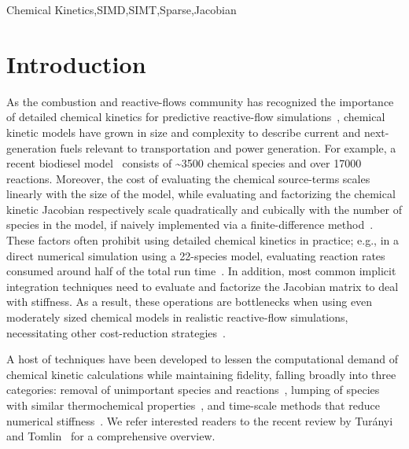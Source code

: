 \documentclass[12pt,number,sort&compress,preprint]{elsarticle}
\begin{document}
\begin{frontmatter}
\begin{keyword}
    Chemical Kinetics\sep SIMD\sep SIMT\sep Sparse\sep Jacobian
\end{keyword}

\end{frontmatter}

\section{Introduction}
%

As the combustion and reactive-flows community has recognized the importance of detailed chemical kinetics for predictive reactive-flow simulations~\cite{LU2009192}, chemical kinetic models have grown in size and complexity to describe current and next-generation fuels relevant to transportation and power generation.
For example, a recent biodiesel model~\cite{WESTBROOK2011742} consists of \textasciitilde\num{3500} chemical species and over \num{17000} reactions.
Moreover, the cost of evaluating the chemical source-terms scales linearly with the size of the model, while evaluating and factorizing the chemical kinetic Jacobian respectively scale quadratically and cubically with the number of species in the model, if naively implemented via a finite-difference method~\cite{LU2009192}.
These factors often prohibit using detailed chemical kinetics in practice; e.g., in a direct numerical simulation using a 22-species model, evaluating reaction rates consumed around half of the total run time~\cite{Spafford:2010aa}.
In addition, most common implicit integration techniques need to evaluate and factorize the Jacobian matrix to deal with stiffness.
As a result, these operations are bottlenecks when using even moderately sized chemical models in realistic reactive-flow simulations, necessitating other cost-reduction strategies~\cite{LU2009192}.

A host of techniques have been developed to lessen the computational demand of chemical kinetic calculations while maintaining fidelity, falling broadly into three categories: removal of unimportant species and reactions~\cite{Lu:2006bb,Pepiot-Desjardins:2008,Hiremath:2010jw,Niemeyer:2010bt,Curtis:2015},
lumping of species with similar thermochemical properties~\cite{Lu:2007,Ahmed:2007fa,Pepiot:2008kq},
and time-scale methods that reduce numerical stiffness~\cite{Maas:1992ws,Lam:1994ws,Lu:2001ve,Gou:2010}.
We refer interested readers to the recent review by Tur\'anyi and Tomlin~\cite{turanyi2016analysis} for a comprehensive overview.
\end{document}

